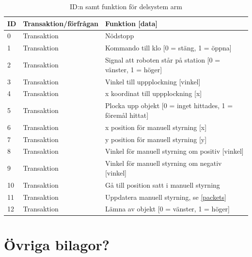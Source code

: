 \begin{table}[H]
\centering
\label{callbacks-arm}
\begin{tabularx}{\textwidth}{|l|l|X|}
\hline
\textbf{ID} & \textbf{Transaktion/förfrågan} & \textbf{Funktion [data]} \\ \hline
0 & Transaktion & Nödstopp \\ \hline
1 & Transaktion & Kommando till klo [0 = stäng, 1 = öppna] \\ \hline
2 & Transaktion & Signal att roboten står på station [0 = vänster, 1 = höger] \\ \hline
3 & Transaktion & Vinkel till uppplockning [vinkel] \\ \hline
4 & Transaktion & x koordinat till uppplockning [x] \\ \hline
5 & Transaktion & Plocka upp objekt [0 = inget hittades, 1 = föremål hittat] \\ \hline
6 & Transaktion & x position för manuell styrning [x] \\ \hline
7 & Transaktion & y position för manuell styrning [y] \\ \hline
8 & Transaktion & Vinkel för manuell styrning om positiv [vinkel] \\ \hline
9 & Transaktion & Vinkel för manuell styrning om negativ [vinkel] \\ \hline
10 & Transaktion & Gå till position satt i manuell styrning \\ \hline
11 & Transaktion & Uppdatera manuell styrning, se \ref{packets} \\ \hline
12 & Transaktion & Lämna av objekt [0 = vänster, 1 = höger] \\ \hline
\end{tabularx}
\caption{ID:n samt funktion för delsystem arm}
\end{table}

\section{Övriga bilagor?}
